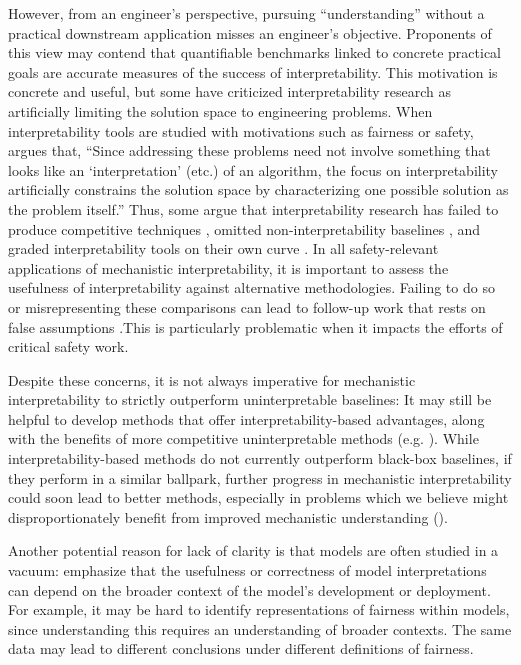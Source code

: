 However, from an engineer's perspective, pursuing “understanding” without a practical downstream application misses an engineer's objective. Proponents of this view may contend that quantifiable benchmarks linked to concrete practical goals are accurate measures of the success of interpretability. This motivation is concrete and useful, but some have criticized interpretability research as artificially limiting the solution space to engineering problems. When interpretability tools are studied with motivations such as fairness or safety, \citet{krishnan2020against} argues that, “Since addressing these problems need not involve something that looks like an `interpretation' (etc.) of an algorithm, the focus on interpretability artificially constrains the solution space by characterizing one possible solution as the problem itself.” Thus, some argue that interpretability research has failed to produce competitive techniques \citep{rauker2023transparentaisurveyinterpreting,Caspar_2023_RedTeamingDNNFeatureSynthesis}, omitted non-interpretability baselines \citep{rudin2019stop, krishnan2020against}, and graded interpretability tools on their own curve \citep{doshivelez2017rigorousscienceinterpretablemachine, MILLER_2019_Explanation, rauker2023transparentaisurveyinterpreting}. In all safety-relevant applications of mechanistic interpretability, it is important to assess the usefulness of interpretability against alternative methodologies. Failing to do so or misrepresenting these comparisons can lead to follow-up work that rests on false assumptions \citep{lipton2018troublingtrendsmachinelearning, leech2024questionablepracticesmachinelearning}.This is particularly problematic when it impacts the efforts of critical safety work.


Despite these concerns, it is not always imperative for mechanistic interpretability to strictly outperform uninterpretable baselines: It may still be helpful to develop methods that offer interpretability-based advantages, along with the benefits of more competitive uninterpretable methods (e.g. \citet{panickssery2024steeringllama2contrastive}). While interpretability-based methods do not currently outperform black-box baselines, if they perform in a similar ballpark, further progress in mechanistic interpretability could soon lead to better methods, especially in problems which we believe might disproportionately benefit from improved mechanistic understanding ().

Another potential reason for lack of clarity is that models are often studied in a vacuum: \citet{Smart_2024} emphasize that the usefulness or correctness of model interpretations can depend on the broader context of the model's development or deployment. For example, it may be hard to identify representations of fairness within models, since understanding this requires an understanding of broader contexts. The same data may lead to different conclusions under different definitions of fairness.

